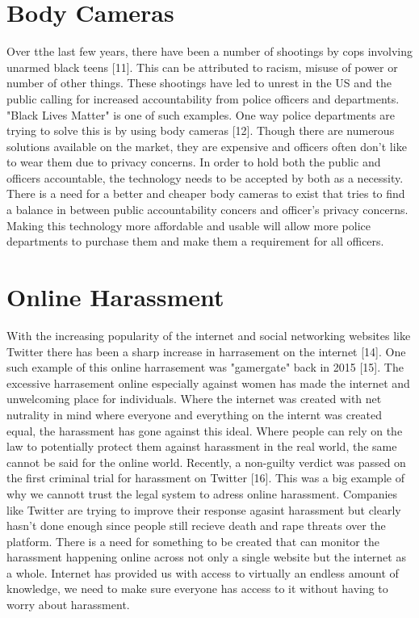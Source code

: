 \documentclass{article}
\begin{document}
\section{Body Cameras}
Over tthe last few years, there have been a number of shootings by cops involving unarmed black teens [11]. This can be attributed to racism, misuse of power or number of other things. These shootings have led to unrest in the US and the public calling for increased accountability from police officers and departments. "Black Lives Matter" is one of such examples. One way police departments are trying to solve this is by using body cameras [12]. Though there are numerous solutions available on the market, they are expensive and officers often don't like to wear them due to privacy concerns. In order to hold both the public and officers accountable, the technology needs to be accepted by both as a necessity. There is a need for a better and cheaper body cameras to exist that tries to find a balance in between public accountability concers and officer's privacy concerns. Making this technology more affordable and usable will allow more police departments to purchase them and make them a requirement for all officers.

\section{Online Harassment}
With the increasing popularity of the internet and social networking websites like Twitter there has been a sharp increase in harrasement on the internet [14]. One such example of this online harrasement was "gamergate" back in 2015 [15]. The excessive harrasement online especially against women has made the internet and unwelcoming place for individuals. Where the internet was created with net nutrality in mind where everyone and everything on the internt was created equal, the harassment has gone against this ideal. Where people can rely on the law to potentially protect them against harassment in the real world, the same cannot be said for the online world. Recently, a non-guilty verdict was passed on the first criminal trial for harassment on Twitter [16]. This was a big example of why we cannott trust the legal system to adress online harassment. Companies like Twitter are trying to improve their response agasint harassment but clearly hasn't done enough since people still recieve death and rape threats over the platform. There is a need for something to be created that can monitor the harassment happening online across not only a single website but the internet as a whole. Internet has provided us with access to virtually an endless amount of knowledge, we need to make sure everyone has access to it without having to worry about harassment. 
\end{document}
